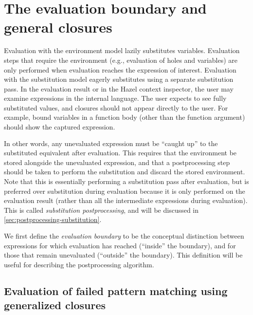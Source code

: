 \section{The evaluation boundary and general closures}
\label{sec:generalized-closures-eval-boundary}

Evaluation with the environment model lazily substitutes variables. Evaluation steps that require the environment (e.g., evaluation of holes and variables) are only performed when evaluation reaches the expression of interest. Evaluation with the substitution model eagerly substitutes using a separate substitution pass. In the evaluation result or in the Hazel context inspector, the user may examine expressions in the internal language. The user expects to see fully substituted values, and closures should not appear directly to the user. For example, bound variables in a function body (other than the function argument) should show the captured expression.

In other words, any unevaluated expression must be ``caught up'' to the substituted equivalent after evaluation. This requires that the environment be stored alongside the unevaluated expression, and that a postprocessing step should be taken to perform the substitution and discard the stored environment. Note that this is essentially performing a substitution pass after evaluation, but is preferred over substitution during evaluation because it is only performed on the evaluation result (rather than all the intermediate expressions during evaluation). This is called \textit{substitution postprocessing}, and will be discussed in \cref{sec:postprocessing-substitution}.

We first define the \textit{evaluation boundary} to be the conceptual distinction between expressions for which evaluation has reached (``inside'' the boundary), and for those that remain unevaluated (``outside'' the boundary). This definition will be useful for describing the postprocessing algorithm.

\subsection{Evaluation of failed pattern matching using generalized closures}
\label{sec:failed_pattern_match}

